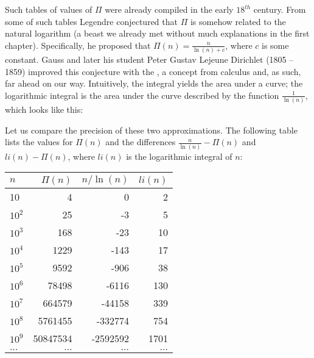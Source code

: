 \documentclass{scrreprt}
\begin{document}
Such tables of values of $\Pi$
were already compiled in the early $18^{th}$ century.
From some of such tables Legendre conjectured
that $\Pi$ is somehow related to the
natural logarithm (a beast we already met
without much explanations in the first chapter).
Specifically, he proposed that 
$\Pi(n) = \frac{n}{\ln(n) + c}$,
where $c$ is some constant.
Gauss and later his student 
Peter Gustav Lejeune Dirichlet (1805 -- 1859)
improved this conjecture with the 
, 
a concept from calculus and,
as such, far ahead on our way.
Intuitively, the integral yields
the area under a curve;
the logarithmic integral 
is the area under the curve described by
the function $\frac{1}{\ln(n)}$,
which looks like this:

\begin{center}
\end{center}

Let us compare the precision of these two approximations.
The following table lists the values for $\Pi(n)$
and the differences $\frac{n}{\ln(n)} - \Pi(n)$ and
$li(n) - \Pi(n)$, where $li(n)$ is the logarithmic integral of $n$:

\begin{center}
\begin{tabular}{|l|r|r|r|}
\hline
$n$     & $\Pi(n)$ & $n/\ln(n)$ & $li(n)$\\\hline\hline
10      &        4 &        0 &    2 \\\hline
$10^2$  &       25 &       -3 &    5 \\\hline
$10^3$  &      168 &      -23 &   10 \\\hline
$10^4$  &     1229 &     -143 &   17 \\\hline
$10^5$  &     9592 &     -906 &   38 \\\hline
$10^6$  &    78498 &    -6116 &  130 \\\hline
$10^7$  &   664579 &   -44158 &  339 \\\hline
$10^8$  &  5761455 &  -332774 &  754 \\\hline
$10^9$  & 50847534 & -2592592 & 1701 \\\hline
$\dots$ &  $\dots$ &  $\dots$ & $\dots$
\end{tabular}
\end{center}
\end{document}

